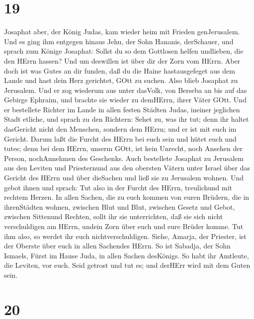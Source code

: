 \hypertarget{section-18}{%
\section{19}\label{section-18}}

 Josaphat aber, der König Judas, kam wieder heim mit Frieden
genJerusalem.  Und es ging ihm entgegen hinaus Jehu, der
Sohn Hananis, derSchauer, und sprach zum Könige Josaphat: Sollst du so
dem Gottlosen helfen undlieben, die den HErrn hassen? Und um deswillen
ist über dir der Zorn vom HErrn.  Aber doch ist was Gutes an
dir funden, daß du die Haine hastausgefeget aus dem Lande und hast dein
Herz gerichtet, GOtt zu suchen.  Also blieb Josaphat zu
Jerusalem. Und er zog wiederum aus unter dasVolk, von Berseba an bis auf
das Gebirge Ephraim, und brachte sie wieder zu demHErrn, ihrer Väter
GOtt.  Und er bestellete Richter im Lande in allen festen
Städten Judas, ineiner jeglichen Stadt etliche,  und sprach
zu den Richtern: Sehet zu, was ihr tut; denn ihr haltet dasGericht nicht
den Menschen, sondern dem HErrn; und er ist mit euch im Gericht.
 Darum laßt die Furcht des HErrn bei euch sein und hütet
euch und tutes; denn bei dem HErrn, unserm GOtt, ist kein Unrecht, noch
Ansehen der Person, nochAnnehmen des Geschenks.  Auch
bestellete Josaphat zu Jerusalem aus den Leviten und Priesternund aus
den obersten Vätern unter Israel über das Gericht des HErrn und über
dieSachen und ließ sie zu Jerusalem wohnen.  Und gebot ihnen
und sprach: Tut also in der Furcht des HErrn, treulichund mit rechtem
Herzen.  In allen Sachen, die zu euch kommen von euren
Brüdern, die in ihrenStädten wohnen, zwischen Blut und Blut, zwischen
Gesetz und Gebot, zwischen Sittenund Rechten, sollt ihr sie
unterrichten, daß sie sich nicht verschuldigen am HErrn, undein Zorn
über euch und eure Brüder komme. Tut ihm also, so werdet ihr euch
nichtverschuldigen.  Siehe, Amarja, der Priester, ist der
Oberste über euch in allen Sachendes HErrn. So ist Sabadja, der Sohn
Ismaels, Fürst im Hause Juda, in allen Sachen desKönigs. So habt ihr
Amtleute, die Leviten, vor euch. Seid getrost und tut es; und derHErr
wird mit dem Guten sein.

\hypertarget{section-19}{%
\section{20}\label{section-19}}

